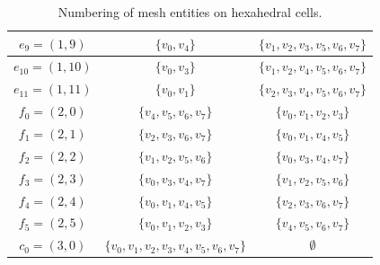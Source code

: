 \begin{table}[H]
\begin{center}
\begin{tabular}{|c|c|c|}
      \hline
      $e_9 = (1, 9)$ & $\{v_0, v_4\}$ & $\{v_1, v_2, v_3, v_5, v_6, v_7\}$ \\
      \hline
      $e_{10} = (1, 10)$ & $\{v_0, v_3\}$ & $\{v_1, v_2, v_4, v_5, v_6, v_7\}$ \\
      \hline
      $e_{11} = (1, 11)$ & $\{v_0, v_1\}$ & $\{v_2, v_3, v_4, v_5, v_6, v_7\}$ \\
      \hline
      $f_0 = (2, 0)$ & $\{v_4, v_5, v_6, v_7\}$ & $\{v_0, v_1, v_2, v_3\}$ \\
      \hline
      $f_1 = (2, 1)$ & $\{v_2, v_3, v_6, v_7\}$ & $\{v_0, v_1, v_4, v_5\}$ \\
      \hline
      $f_2 = (2, 2)$ & $\{v_1, v_2, v_5, v_6\}$ & $\{v_0, v_3, v_4, v_7\}$ \\
      \hline
      $f_3 = (2, 3)$ & $\{v_0, v_3, v_4, v_7\}$ & $\{v_1, v_2, v_5, v_6\}$ \\
      \hline
      $f_4 = (2, 4)$ & $\{v_0, v_1, v_4, v_5\}$ & $\{v_2, v_3, v_6, v_7\}$ \\
      \hline
      $f_5 = (2, 5)$ & $\{v_0, v_1, v_2, v_3\}$ & $\{v_4, v_5, v_6, v_7\}$ \\
      \hline
      $c_0 = (3, 0)$ & $\{v_0, v_1, v_2, v_3, v_4, v_5, v_6, v_7\}$ & $\emptyset$ \\
      \hline
    \end{tabular}
    \caption{Numbering of mesh entities on hexahedral cells.}
    \label{tab:hexahedron,entities}
  \end{center}
\end{table}
